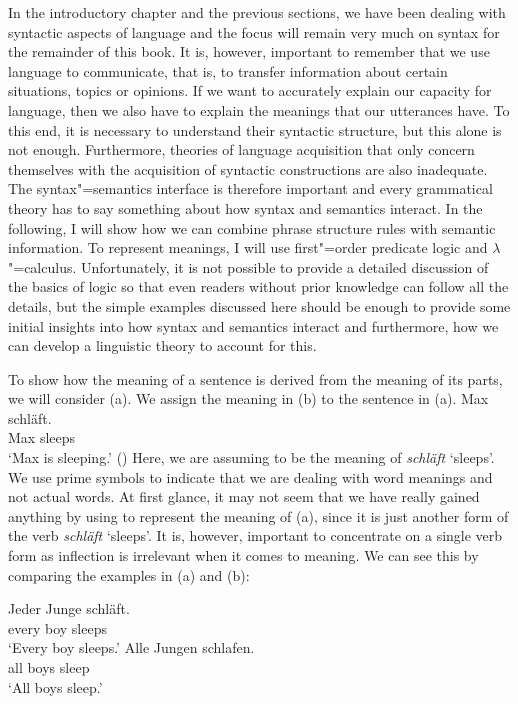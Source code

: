 In the introductory chapter and the previous sections, we have been dealing with syntactic aspects
of language and the focus will remain very much on syntax for the remainder of this book. It is,
however, important to remember that we use language to communicate, that is, to transfer information
about certain situations, topics or opinions. If we want to accurately explain our capacity for
language, then we also have to explain the meanings that our utterances have. To this end, it is
necessary to understand their syntactic structure, but this alone is not enough. Furthermore,
theories of language acquisition that only concern themselves with the acquisition of syntactic
constructions are also inadequate. The syntax"=semantics interface
is therefore important and every grammatical theory has to say something about how syntax and
semantics interact. In the following, I will show how we can combine phrase structure rules with
semantic information. To represent meanings, I will use first"=order predicate logic and
$\lambda$"=calculus. Unfortunately, it is not possible to provide a detailed
discussion of the basics of logic so that even readers without prior knowledge can follow all the
details, but the simple examples discussed here should be enough to provide some initial
insights into how syntax and semantics interact and furthermore, how we can develop a linguistic
theory to account for this.

To show how the meaning of a sentence is derived from the meaning of its parts, we will consider (a). We
assign the meaning in (b) to the sentence in (a). 
\eal
\ex\label{Bsp-Max-schlaeft}
\gll Max schläft.\\
     Max sleeps\\
\glt `Max is sleeping.'
\ex\label{Bsp-schlafen-max} 
()
\zl
Here, we are assuming  to be the meaning of  \emph{schläft} `sleeps'. We use prime symbols to indicate
that we are dealing with word meanings and not actual words. At first glance, it may not seem that we have really gained anything
by using  to represent the meaning of (a), since it is just another form of the verb \emph{schläft} `sleeps'.
It is, however, important to concentrate on a single verb form as inflection is irrelevant when it comes to meaning. We can see this by comparing the 
examples in (a) and (b):

\eal
\ex 
\gll Jeder Junge schläft.\\
     every boy sleeps\\
\glt `Every boy sleeps.'
\ex 
\gll Alle Jungen schlafen.\\
     all boys sleep\\
\glt `All boys sleep.'	 
\zl

